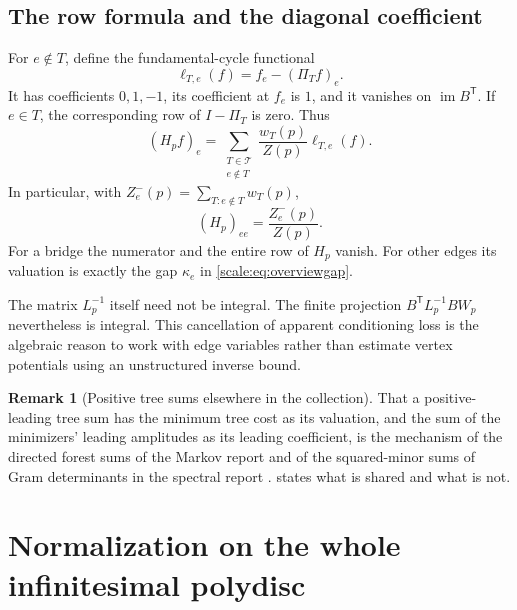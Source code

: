\documentclass[11pt,a4paper]{article}
\numberwithin{equation}{section}
\theoremstyle{definition}
\newtheorem{remark}[theorem]{Remark}
\newcommand{\TT}{\mathcal T}
\newcommand{\im}{\operatorname{im}}
\begin{document}
\subsection{The row formula and the diagonal coefficient}
For $e\notin T$, define the fundamental-cycle functional
\[
 \ell_{T,e}(f)=f_e-(\Pi_Tf)_e.
\]
It has coefficients $0,1,-1$, its coefficient at $f_e$ is $1$, and
it vanishes on $\im B^{\mathsf T}$. If $e\in T$, the corresponding
row of $I-\Pi_T$ is zero. Thus
\begin{equation}\label{scale:eq:rowtree}
 (H_pf)_e=\sum_{\substack{T\in\TT\\e\notin T}}
              \frac{w_T(p)}{Z(p)}\ell_{T,e}(f).
\end{equation}
In particular, with $Z_e^-(p)=\sum_{T:e\notin T}w_T(p)$,
\begin{equation}\label{scale:eq:Hdiagonal}
 (H_p)_{ee}=\frac{Z_e^-(p)}{Z(p)}.
\end{equation}
For a bridge the numerator and the entire row of $H_p$ vanish.
For other edges its valuation is exactly the gap $\kappa_e$ in
\eqref{scale:eq:overviewgap}.

The matrix $L_p^{-1}$ itself need not be integral. The finite
projection $B^{\mathsf T}L_p^{-1}BW_p$ nevertheless is integral.
This cancellation of apparent conditioning loss is the algebraic
reason to work with edge variables rather than estimate vertex
potentials using an unstructured inverse bound.

\begin{remark}[Positive tree sums elsewhere in the collection]
\label{scale:rem:trees}
That a positive-leading tree sum has the minimum tree cost as its valuation,
and the sum of the minimizers' leading amplitudes as its leading coefficient,
is the mechanism of the directed forest sums of the Markov report
\cite{RepoMarkov} and of the squared-minor sums of Gram determinants in the
spectral report
\cite{RepoSpectral}.  states what is shared and
what is not.
\end{remark}

\section{Normalization on the whole infinitesimal polydisc}
\label{scale:sec:normalization}
\end{document}
